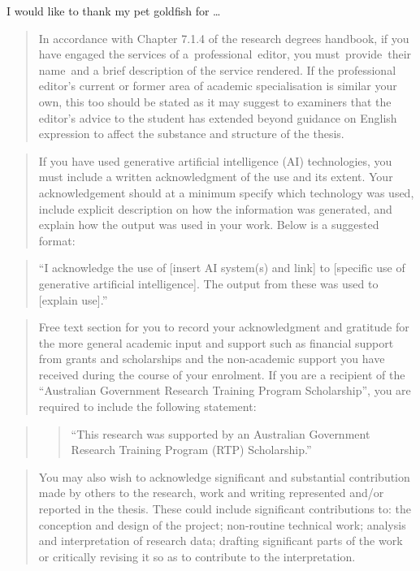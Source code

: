 \documentclass[
  11pt,
  a4paper,
  nottoc]{report}
\begin{document}
I would like to thank my pet goldfish for \ldots{}

\begin{quote}
In accordance with Chapter 7.1.4 of the research degrees handbook, if
you have engaged the services of a~professional~editor, you
must~provide~their name~and a brief description of the service rendered.
If the professional editor's current or former area of academic
specialisation is similar your own, this too should be stated as it may
suggest to examiners that the editor's advice to the student has
extended beyond guidance on English expression to affect the substance
and structure of the thesis.
\end{quote}

\begin{quote}
If you have used generative artificial intelligence (AI) technologies,
you must include a written acknowledgment of the use and its extent.
Your acknowledgement should at a minimum specify which technology was
used, include explicit description on how the information was generated,
and explain how the output was used in your work. Below is a suggested
format:
\end{quote}

\begin{quote}
``I acknowledge the use of {[}insert AI system(s) and link{]} to
{[}specific use of generative artificial intelligence{]}. The output
from these was used to {[}explain use{]}.''
\end{quote}

\begin{quote}
Free text section for you to record your acknowledgment and gratitude
for the more general academic input and support such as financial
support from grants and scholarships and the non-academic support you
have received during the course of your enrolment. If you are a
recipient of the ``Australian Government Research Training Program
Scholarship'', you are required to include the following statement:
\end{quote}

\begin{quote}
\begin{quote}
``This research was supported by an Australian Government Research
Training Program (RTP) Scholarship.''
\end{quote}
\end{quote}

\begin{quote}
You may also wish to acknowledge significant and substantial
contribution made by others to the research, work and writing
represented and/or reported in the thesis. These could include
significant contributions to: the conception and design of the project;
non-routine technical work; analysis and interpretation of research
data; drafting significant parts of the work or critically revising it
so as to contribute to the interpretation.
\end{quote}
\end{document}
